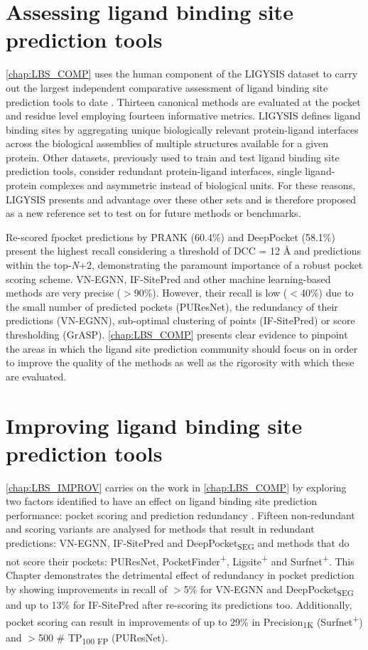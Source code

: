 \section{Assessing ligand binding site prediction tools}

\autoref{chap:LBS_COMP} uses the human component of the LIGYSIS dataset to carry out the largest independent comparative assessment of ligand binding site prediction tools to date \cite{UTGES_2024_LBSCOMP}. Thirteen canonical methods are evaluated at the pocket and residue level employing fourteen informative metrics. LIGYSIS defines ligand binding sites by aggregating unique biologically relevant protein-ligand interfaces across the biological assemblies of multiple structures available for a given protein. Other datasets, previously used to train and test ligand binding site prediction tools, consider redundant protein-ligand interfaces, single ligand-protein complexes and asymmetric instead of biological units. For these reasons, LIGYSIS presents and advantage over these other sets and is therefore proposed as a new reference set to test on for future methods or benchmarks.

Re-scored fpocket predictions by PRANK (60.4\%) and DeepPocket (58.1\%) present the highest recall considering a threshold of DCC = 12 \AA{} and predictions within the top-\textit{N}+2, demonstrating the paramount importance of a robust pocket scoring scheme. VN-EGNN, IF-SitePred and other machine learning-based methods are very precise ($>$90\%). However, their recall is low ($<$40\%) due to the small number of predicted pockets (PUResNet), the redundancy of their predictions (VN-EGNN), sub-optimal clustering of points (IF-SitePred) or score thresholding (GrASP). \autoref{chap:LBS_COMP} presents clear evidence to pinpoint the areas in which the ligand site prediction community should focus on in order to improve the quality of the methods as well as the rigorosity with which these are evaluated.

\section{Improving ligand binding site prediction tools}

\autoref{chap:LBS_IMPROV} carries on the work in \autoref{chap:LBS_COMP} by exploring two factors identified to have an effect on ligand binding site prediction performance: pocket scoring and prediction redundancy \cite{UTGES_2024_LBSCOMP}. Fifteen non-redundant and scoring variants are analysed for methods that result in redundant predictions: VN-EGNN, IF-SitePred and DeepPocket\textsubscript{SEG} and methods that do not score their pockets: PUResNet, PocketFinder\textsuperscript{+}, Ligsite\textsuperscript{+} and Surfnet\textsuperscript{+}. This Chapter demonstrates the detrimental effect of redundancy in pocket prediction by showing improvements in recall of $>$5\% for VN-EGNN and DeepPocket\textsubscript{SEG} and up to 13\% for IF-SitePred after re-scoring its predictions too. Additionally, pocket scoring can result in improvements of up to 29\% in Precision\textsubscript{1K} (Surfnet\textsuperscript{+}) and $>$500 \# TP\textsubscript{100 FP} (PUResNet).

